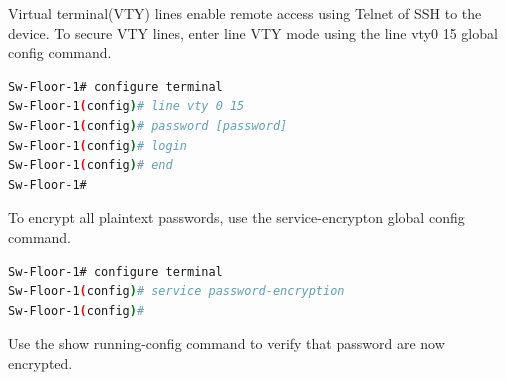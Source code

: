 \documentclass[a4paper,11pt]{article}
\begin{document}
\begin{tcolorbox}[colframe=blue!80, colback=blue!20, coltitle=black, title= Scenario: Securing Using Telnet SSH]
  Virtual terminal(VTY) lines enable remote access using Telnet of SSH to the device. To secure VTY lines, enter line VTY mode using the line vty0 15 global config command.\\
\begin{lstlisting}[language=bash, caption={Configuration on a Cisco Device}]
Sw-Floor-1# configure terminal
Sw-Floor-1(config)# line vty 0 15
Sw-Floor-1(config)# password [password]
Sw-Floor-1(config)# login
Sw-Floor-1(config)# end
Sw-Floor-1#
\end{lstlisting}
\end{tcolorbox}

\begin{tcolorbox}[colframe=blue!80, colback=blue!20, coltitle=black, title= Scenario: Encrypt Passwords]
  To encrypt all plaintext passwords, use the service-encrypton global config command.\\
\begin{lstlisting}[language=bash, caption={Configuration on a Cisco Device}]
Sw-Floor-1# configure terminal
Sw-Floor-1(config)# service password-encryption
Sw-Floor-1(config)# 
\end{lstlisting}
Use the show running-config command to verify that password are now encrypted.\\
\end{tcolorbox}
\end{document}
